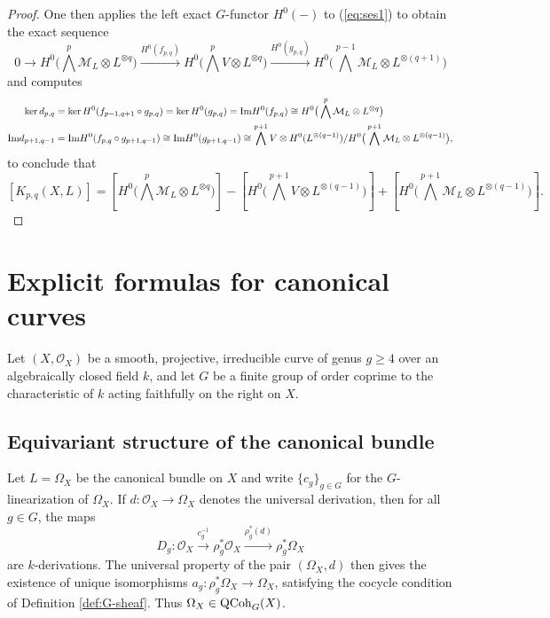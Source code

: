\documentclass[10pt]{amsart}
\theoremstyle{definition}
\begin{document}
\begin{proof}
One then applies the left exact $G$-functor $H^0(-)$ to (\ref{eq:ses1}) to obtain the exact sequence
\[
0\rightarrow 
H^0\big(\bigwedge^{p}\mathcal{M}_L\otimes L^{\otimes q}\big)
\overset{H^0(f_{p,q})}{\longrightarrow}
H^0\big(\bigwedge^{p}V\otimes L^{\otimes q}\big)
\overset{H^0(g_{p,q})}{\longrightarrow}
 H^0\big(\bigwedge^{p-1}\mathcal{M}_L\otimes L^{\otimes (q+1)}\big)
\]
and computes
\begin{align*}
\ker d_{p,q}&=\ker H^0(f_{p-1,q+1}\circ g_{p,q})=\ker H^0(g_{p,q})={\rm Im}H^0( f_{p,q})\cong H^0\big(\bigwedge^{p}\mathcal{M}_L\otimes L^{\otimes q}\big)\\
{\rm Im}d_{p+1,q-1}&={\rm Im}H^0(f_{p,q}\circ g_{p+1,q-1})\cong{\rm Im} H^0(g_{p+1,q-1})\cong \bigwedge^{p+1}V\otimes H^0(L^{\otimes (q-1)})/H^0\big( \bigwedge^{p+1}\mathcal{M}_L\otimes L^{\otimes (q-1)}\big),\\
\end{align*}
to conclude that
\[
[K_{p,q}(X,L)]
=[H^0\big(\bigwedge^p\mathcal{M}_L\otimes L^{\otimes q}\big)]
-[H^0\big(\bigwedge^{p+1}V\otimes  L^{\otimes (q-1)}\big)]
+[H^0\big( \bigwedge^{p+1}\mathcal{M}_L\otimes L^{\otimes (q-1)}\big)].
\]
\end{proof}


%


\section{Explicit formulas for canonical curves}
Let $(X,\mathcal{O}_X)$ be a smooth, projective, irreducible curve of genus $g\geq 4$ over an algebraically closed field $k$, and let $G$ be a finite group of order coprime to the characteristic of $k$ acting faithfully on the right on $X$. 

\subsection{Equivariant structure of the canonical bundle} Let $L=\Omega_X$ be the canonical bundle on $X$ and write $\{c_g\}_{g\in G}$ for the $G$-linearization of $\Omega_X$. If $d:\mathcal{O}_X\rightarrow\Omega_X$ denotes the universal derivation, then for all $g\in G$, the maps
\[
D_g:\mathcal{O}_X\overset{c_g^{-1}}{\longrightarrow}\rho_g^*\mathcal{O}_X\overset{\rho^*_g(d)}{\longrightarrow}\rho_g^*\Omega_X
\]
are $k$-derivations. The universal property of the pair $(\Omega_X,d)$ then gives the existence of unique isomorphisms $a_g:\rho_g^*\Omega_X\rightarrow \Omega_X$, satisfying the cocycle condition of Definition \ref{def:G-sheaf}. Thus $\Omega_X\in{\rm QCoh}_G(X)$.
\end{document}

